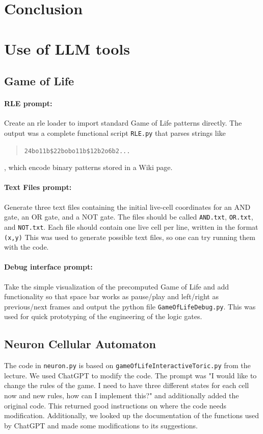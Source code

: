 \section{Conclusion}


\newpage
\section{Use of LLM tools}
\subsection{Game of Life}
\paragraph{RLE prompt:}  Create an rle loader to import standard Game of Life patterns directly. The output was a
complete functional script \texttt{RLE.py} that parses strings like
\begin{quote}
\verb+24bo11b$22bobo11b$12b2o6b2...+
\end{quote}
, which encode binary patterns stored in a Wiki page.

\paragraph{Text Files prompt:}  Generate three text files containing the initial live-cell coordinates for an AND gate, an OR gate, and a NOT gate. The files should be called \texttt{AND.txt}, \texttt{OR.txt}, and \texttt{NOT.txt}. Each file should contain one live cell per line, written in the format \texttt{(x,y)}
This was used to generate possible text files, so one can try running them with the code.

\paragraph{Debug interface prompt:} Take the simple visualization of the precomputed Game of Life and add functionality so that space bar works as pause/play
 and left/right as previous/next frames and output the python file \texttt{GameOfLifeDebug.py}. This was used for quick prototyping of the engineering of the
  logic gates.




\subsection{Neuron Cellular Automaton}
The code in \verb+neuron.py+ is based on \verb+gameOfLifeInteractiveToric.py+ from the lecture. We used ChatGPT to modify the code. The prompt was 
"I would like to change the rules of the game. I need to have three different states for each cell now and new rules, how can I implement this?" and additionally added the 
original code. This returned good instructions on where the code needs modification. Additionally, we looked up the documentation of the functions used by ChatGPT and made 
some modifications to its suggestions.  

